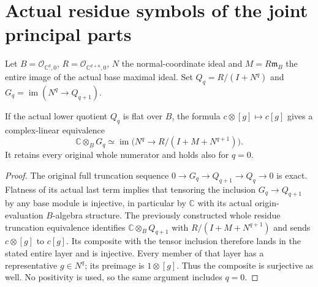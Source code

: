 \section{Actual residue symbols of the joint principal parts}

Let $B=\mathcal O_{\mathbb C^d,0}$, $R=\mathcal O_{\mathbb C^{d+n},0}$,
$N$ the normal-coordinate ideal and $M=R\mathfrak m_B$ the entire
image of the actual base maximal ideal. Set
$Q_q=R/(I+N^q)$ and
$G_q=\operatorname{im}(N^q\to Q_{q+1})$.

\begin{theorem}
\label{hir:actual-principal-parts-residue-layer}
\leanok
{}
If the actual lower quotient $Q_q$ is flat over $B$, the formula
$c\otimes[g]\mapsto c[g]$ gives a complex-linear equivalence
\[
 \mathbb C\otimes_B G_q\simeq
 \operatorname{im}\bigl(N^q\to R/(I+M+N^{q+1})\bigr).
\]
It retains every original whole numerator and holds also for $q=0$.
\end{theorem}
\begin{proof}
The original full truncation sequence
$0\to G_q\to Q_{q+1}\to Q_q\to0$ is exact. Flatness of its actual
last term implies that tensoring the inclusion $G_q\to Q_{q+1}$ by
any base module is injective, in particular by $\mathbb C$ with its
actual origin-evaluation $B$-algebra structure. The previously constructed whole residue
truncation equivalence identifies
$\mathbb C\otimes_B Q_{q+1}$ with $R/(I+M+N^{q+1})$ and sends
$c\otimes[g]$ to $c[g]$. Its composite with the tensor inclusion
therefore lands in the stated entire layer and is injective.
Every member of that layer has a representative $g\in N^q$; its
preimage is $1\otimes[g]$. Thus the composite is surjective as well.
No positivity is used, so the same argument includes $q=0$.
\end{proof}

